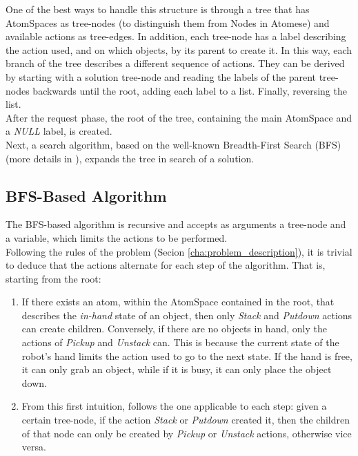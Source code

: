 One of the best ways to handle this structure is through a tree that has AtomSpaces as tree-nodes (to distinguish them from Nodes in Atomese) and available actions as tree-edges.
In addition, each tree-node has a label describing the action used, and on which objects, by its parent to create it.
In this way, each branch of the tree describes a different sequence of actions. They can be derived by starting with a solution tree-node and reading the labels of the parent tree-nodes backwards until the root, adding each label to a list. Finally, reversing the list.  \\

After the request phase, the root of the tree, containing the main AtomSpace and a \textit{NULL} label, is created. \\
Next, a search algorithm, based on the well-known Breadth-First Search (BFS) (more details in \cite{BFS-wiki, BFS}), expands the tree in search of a solution.

\subsection{BFS-Based Algorithm}\label{sec:bfs_search}

The BFS-based algorithm is recursive and accepts as arguments a tree-node and a variable, which limits the actions to be performed. \\
Following the rules of the problem (Secion \ref{cha:problem_description}), it is trivial to deduce that the actions alternate for each step of the algorithm.
That is, starting from the root:

\begin{enumerate} 
	\item If there exists an atom, within the AtomSpace contained in the root, that describes the \textit{in-hand} state of an object, then only \textit{Stack} and \textit{Putdown} actions can create children. Conversely, if there are no objects in hand, only the actions of \textit{Pickup} and \textit{Unstack} can. This is because the current state of the robot's hand limits the action used to go to the next state. If the hand is free, it can only grab an object, while if it is busy, it can only place the object down.

	\item From this first intuition, follows the one applicable to each step: given a certain tree-node, if the action \textit{Stack} or \textit{Putdown} created it, then the children of that node can only be created by \textit{Pickup} or \textit{Unstack} actions, otherwise vice versa.
\end{enumerate}

